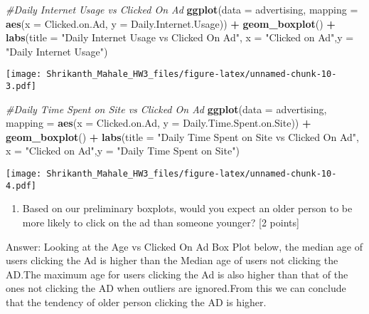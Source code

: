 \documentclass[]{article}
\newenvironment{Shaded}{\begin{snugshade}}{\end{snugshade}}
\newcommand{\KeywordTok}[1]{\textcolor[rgb]{0.13,0.29,0.53}{\textbf{#1}}}
\newcommand{\DataTypeTok}[1]{\textcolor[rgb]{0.13,0.29,0.53}{#1}}
\newcommand{\StringTok}[1]{\textcolor[rgb]{0.31,0.60,0.02}{#1}}
\newcommand{\CommentTok}[1]{\textcolor[rgb]{0.56,0.35,0.01}{\textit{#1}}}
\newcommand{\OperatorTok}[1]{\textcolor[rgb]{0.81,0.36,0.00}{\textbf{#1}}}
\newcommand{\NormalTok}[1]{#1}
\providecommand{\tightlist}{%
  \setlength{\itemsep}{0pt}\setlength{\parskip}{0pt}}
\begin{document}
\begin{Shaded}
\begin{Highlighting}[]
\CommentTok{#Daily Internet Usage vs Clicked On Ad}
\KeywordTok{ggplot}\NormalTok{(}\DataTypeTok{data =}\NormalTok{ advertising, }\DataTypeTok{mapping =} \KeywordTok{aes}\NormalTok{(}\DataTypeTok{x =}\NormalTok{ Clicked.on.Ad, }\DataTypeTok{y =}\NormalTok{ Daily.Internet.Usage)) }\OperatorTok{+}\StringTok{ }\KeywordTok{geom_boxplot}\NormalTok{() }\OperatorTok{+}\StringTok{ }\KeywordTok{labs}\NormalTok{(}\DataTypeTok{title =} \StringTok{"Daily Internet Usage vs Clicked On Ad"}\NormalTok{, }\DataTypeTok{x =} \StringTok{"Clicked on Ad"}\NormalTok{,}\DataTypeTok{y =} \StringTok{"Daily Internet Usage"}\NormalTok{)}
\end{Highlighting}
\end{Shaded}

\texttt{[image: Shrikanth\_Mahale\_HW3\_files/figure-latex/unnamed-chunk-10-3.pdf]}

\begin{Shaded}
\begin{Highlighting}[]
\CommentTok{#Daily Time Spent on Site vs Clicked On Ad}
\KeywordTok{ggplot}\NormalTok{(}\DataTypeTok{data =}\NormalTok{ advertising, }\DataTypeTok{mapping =} \KeywordTok{aes}\NormalTok{(}\DataTypeTok{x =}\NormalTok{ Clicked.on.Ad, }\DataTypeTok{y =}\NormalTok{ Daily.Time.Spent.on.Site)) }\OperatorTok{+}\StringTok{ }\KeywordTok{geom_boxplot}\NormalTok{() }\OperatorTok{+}\StringTok{ }\KeywordTok{labs}\NormalTok{(}\DataTypeTok{title =} \StringTok{"Daily Time Spent on Site vs Clicked On Ad"}\NormalTok{, }\DataTypeTok{x =} \StringTok{"Clicked on Ad"}\NormalTok{,}\DataTypeTok{y =} \StringTok{"Daily Time Spent on Site"}\NormalTok{)}
\end{Highlighting}
\end{Shaded}

\texttt{[image: Shrikanth\_Mahale\_HW3\_files/figure-latex/unnamed-chunk-10-4.pdf]}

\begin{enumerate}
\def\labelenumi{\alph{enumi})}
\setcounter{enumi}{3}
\tightlist
\item
  Based on our preliminary boxplots, would you expect an older person to
  be more likely to click on the ad than someone younger? {[}2 points{]}
\end{enumerate}

Answer: Looking at the Age vs Clicked On Ad Box Plot below, the median
age of users clicking the Ad is higher than the Median age of users not
clicking the AD.The maximum age for users clicking the Ad is also higher
than that of the ones not clicking the AD when outliers are ignored.From
this we can conclude that the tendency of older person clicking the AD
is higher.
\end{document}
